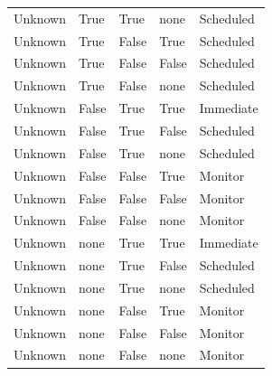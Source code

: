 \begin{longtable}{@{}lllll@{}}
Unknown & True & True & none & Scheduled \\
Unknown & True & False & True & Scheduled \\
Unknown & True & False & False & Scheduled \\
Unknown & True & False & none & Scheduled \\
Unknown & False & True & True & Immediate \\
Unknown & False & True & False & Scheduled \\
Unknown & False & True & none & Scheduled \\
Unknown & False & False & True & Monitor \\
Unknown & False & False & False & Monitor \\
Unknown & False & False & none & Monitor \\
Unknown & none & True & True & Immediate \\
Unknown & none & True & False & Scheduled \\
Unknown & none & True & none & Scheduled \\
Unknown & none & False & True & Monitor \\
Unknown & none & False & False & Monitor \\
Unknown & none & False & none & Monitor \\
\end{longtable}
